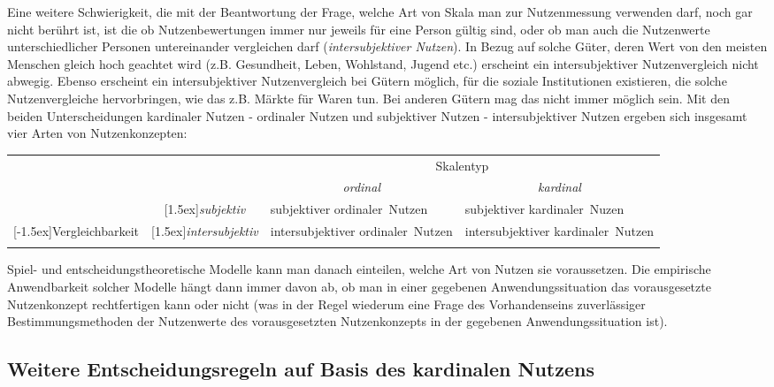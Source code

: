 Eine weitere Schwierigkeit, die mit der Beantwortung der Frage, welche Art von
Skala man zur Nutzenmessung verwenden darf, noch gar nicht berührt ist, ist die
ob Nutzenbewertungen immer nur jeweils für eine Person gültig sind, 
 oder ob man
auch die Nutzenwerte unterschiedlicher Personen untereinander vergleichen darf
({\em intersubjektiver Nutzen}). In Bezug
auf solche Güter, deren Wert von den meisten Menschen gleich hoch geachtet wird
(z.B. Gesundheit, Leben, Wohlstand, Jugend etc.) erscheint ein intersubjektiver
Nutzenvergleich nicht abwegig. Ebenso erscheint ein intersubjektiver
Nutzenvergleich bei Gütern möglich, für die soziale Institutionen existieren, die
solche Nutzenvergleiche hervorbringen, wie das z.B. Märkte für Waren tun. Bei
anderen Gütern mag das nicht immer möglich sein. Mit den beiden Unterscheidungen
kardinaler Nutzen - ordinaler Nutzen und subjektiver Nutzen - intersubjektiver
Nutzen ergeben sich insgesamt vier Arten von Nutzenkonzepten:
\begin{center}
\begin{tabular}{cc|p{3.2cm}|p{3.2cm}|}
& \multicolumn{1}{c}{} & \multicolumn{2}{c}{Skalentyp} \\
&                  & \multicolumn{1}{c|}{\em ordinal}
                   & \multicolumn{1}{c}{\em kardinal}
\\ \cline{2-4}
& \raisebox{-1.5ex}[1.5ex]{\em subjektiv}  & subjektiver \mbox{ordinaler
Nutzen} & subjektiver \mbox{kardinaler Nuzen}   \\
\cline{2-4}
\raisebox{1.5ex}[-1.5ex]{Vergleichbarkeit}
& \raisebox{-1.5ex}[1.5ex]{\em intersubjektiv}
& intersubjektiver \mbox{ordinaler Nutzen} &
intersubjektiver \mbox{kardinaler Nutzen} \\
\cline{2-4}
\\
\end{tabular}
\end{center}
Spiel- und entscheidungstheoretische Modelle kann man danach einteilen, welche
Art von Nutzen sie voraussetzen. Die empirische Anwendbarkeit solcher Modelle
hängt dann immer davon ab, ob man in einer gegebenen Anwendungssituation das
vorausgesetzte Nutzenkonzept rechtfertigen kann oder nicht (was in der Regel
wiederum eine Frage des Vorhandenseins zuverlässiger Bestimmungsmethoden der
Nutzenwerte des vorausgesetzten Nutzenkonzepts in der gegebenen Anwendungssituation 
ist).

\subsection{Weitere Entscheidungsregeln auf Basis des kardinalen Nutzens}
